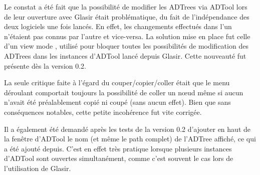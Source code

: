 Le constat a été fait que la possibilité de modifier les ADTrees via ADTool lors de leur ouverture avec Glasir était problématique, du fait de l'indépendance des deux logiciels une fois lancés. En effet, les changements effectués dans l'un n'étaient pas connus par l'autre et vice-versa. La solution mise en place fut celle d'un \og view mode \fg{}, utilisé pour bloquer toutes les possibilités de modification des ADTrees dans les instances d'ADTool lancé depuis Glasir. Cette nouveauté fut présente dès la version 0.2.

La seule critique faite à l'égard du couper/copier/coller était que le menu déroulant comportait toujours la possibilité de coller un n\oe{}ud même si aucun n'avait été préalablement copié ni coupé (sans aucun effet). Bien que sans conséquences notables, cette petite incohérence fut vite corrigée. 

Il a également été demandé après les tests de la version 0.2 d'ajouter en haut de la fenêtre d'ADTool le nom (et même le path complet) de l'ADTree affiché, ce qui a été ajouté depuis. C'est en effet très pratique lorsque plusieurs instances d'ADTool sont ouvertes simultanément, comme c'est souvent le cas lors de l'utilisation de Glasir. 






